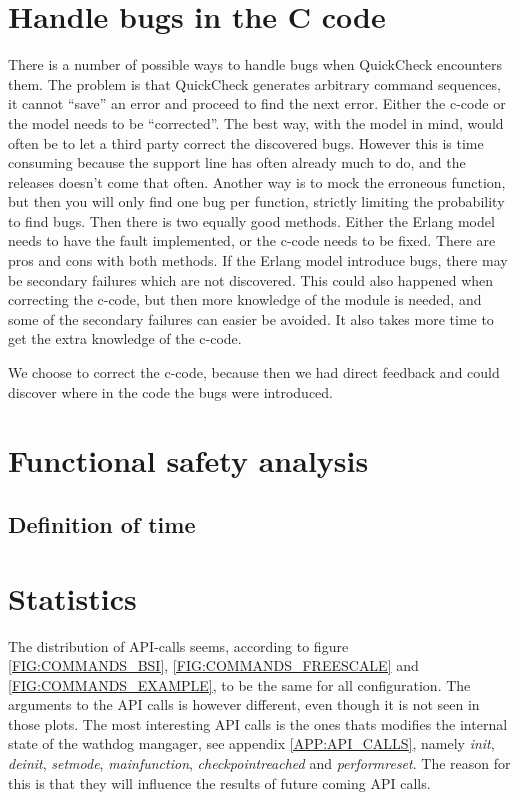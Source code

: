 \section{Handle bugs in the C code}
\label{sec:handlebugs}
There is a number of possible ways to handle bugs when QuickCheck encounters
them. The problem is that QuickCheck generates arbitrary command sequences, it
cannot ``save'' an error and proceed to find the next error. Either the c-code
or the model needs to be ``corrected''.
The best way, with the model in mind, would often be to let a third
party correct the discovered bugs. However this is time consuming because the
support line has often already much to do, and the releases doesn't come that
often.
Another way is to mock the erroneous function, but then you will only find one
bug per function, strictly limiting the probability to find bugs.
Then there is two equally good methods. Either the Erlang model needs to have
the fault implemented, or the c-code needs to be fixed. There are pros and cons
with both methods. If the Erlang model introduce bugs, there may be secondary
failures which are not discovered. This could also happened when correcting the
c-code, but then more knowledge of the module is needed, and some of the
secondary failures can easier be avoided. It also takes more time to get the
extra knowledge of the c-code.

We choose to correct the c-code, because then we had direct feedback and could
discover where in the code the bugs were introduced.

\section{Functional safety analysis}
\subsection{Definition of time}
\label{SEC:FUNCTIONAL_SAFETY_TIME}

\section{Statistics}
The distribution of API-calls seems, according to figure
\ref{FIG:COMMANDS_BSI}, \ref{FIG:COMMANDS_FREESCALE} and
\ref{FIG:COMMANDS_EXAMPLE}, to be the same for all configuration. The arguments
to the API calls is however different, even though it is not seen in those plots.
The most interesting API calls is the ones thats modifies the internal state of
the wathdog mangager, see appendix \ref{APP:API_CALLS}, namely \emph{init},
\emph{deinit}, \emph{setmode}, \emph{mainfunction},
\emph{checkpointreached} and \emph{performreset}. The reason for this is that
they will influence the results of future coming API calls.

